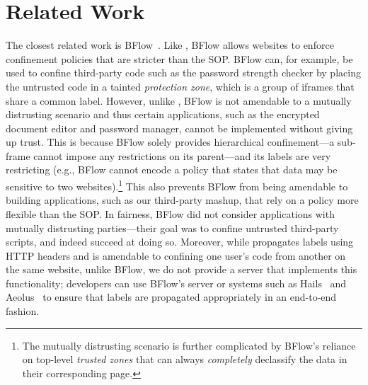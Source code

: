 \section{Related Work}
\label{sec:related}

The closest related work is BFlow~\cite{Yip:2009:PBS}.
%
Like \sys{}, BFlow allows websites to enforce confinement policies
that are stricter than the SOP.
%
BFlow can, for example, be used to confine third-party code such as
the password strength checker by placing the untrusted code in a
tainted \emph{protection zone}, which is a group of iframes that share
a common label.
%
However, unlike \sys{}, BFlow is not amendable to a mutually
distrusting scenario and thus certain applications, such as the
encrypted document editor and password manager, cannot be implemented
without giving up trust.
%
This is because BFlow solely provides hierarchical confinement---a
sub-frame cannot impose any restrictions on its parent---and its
labels are very restricting (e.g., BFlow cannot encode a policy that
states that data may be sensitive to two websites).\footnote{
The mutually distrusting scenario is further complicated by BFlow's
reliance on top-level \emph{trusted zones} that can always
\emph{completely} declassify the data in their corresponding page.}
%
This also prevents BFlow from being amendable to building
applications, such as our third-party mashup, that rely on a policy
more flexible than the SOP.
%
In fairness, BFlow did not consider applications with mutually
distrusting parties---their goal was to confine untrusted third-party
scripts, and indeed succeed at doing so.
%
Moreover, while \sys{} propagates labels using HTTP headers and is
amendable to confining one user's code from another on the same
website, unlike BFlow, we do not provide a server that implements this
functionality; developers can use BFlow's server or systems such as
Hails~\cite{giffin:2012:hails} and Aeolus~\cite{cheng:aeolus} to
ensure that labels are propagated appropriately in an end-to-end
fashion.
%



